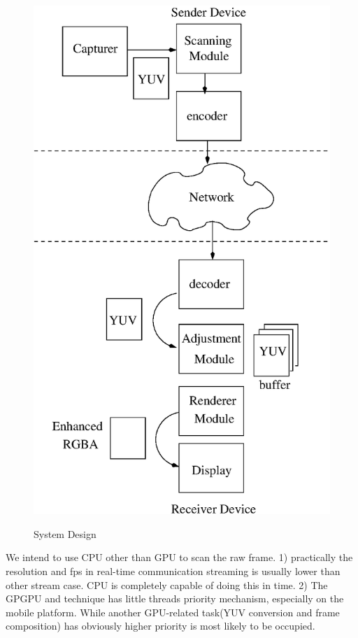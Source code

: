 \begin{figure}[t]
  \begin{center}
  \label{fig:design}
  \includegraphics[scale=.5]{./figures/design.eps}
  \caption{System Design}
  \end{center}
\end{figure}

We intend to use CPU other than GPU to scan the raw frame. 1)
practically the resolution and fps in real-time communication
streaming is usually lower than other stream case. CPU is completely
capable of doing this in time. 2) The GPGPU and technique has little
threads priority mechanism, especially on the mobile platform. While
another GPU-related task(YUV conversion and frame composition) has
obviously higher priority is most likely to be occupied. 


